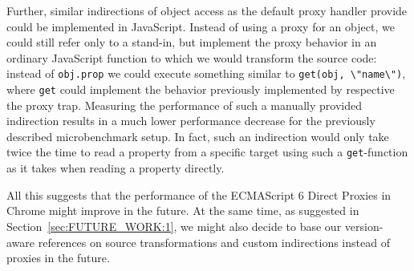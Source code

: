Further, similar indirections of object access as the default proxy handler provide could be implemented in JavaScript.
Instead of using a proxy for an object, we could still refer only to a stand-in, but implement the proxy behavior in an ordinary JavaScript function to which we would transform the source code: instead of \lstinline{obj.prop} we could execute something similar to \lstinline{get(obj, \"name\")}, where \lstinline{get} could implement the behavior previously implemented by respective the proxy trap.
Measuring the performance of such a manually provided indirection results in a much lower performance decrease for the previously described microbenchmark setup.
In fact, such an indirection would only take twice the time to read a property from a specific target using such a \lstinline{get}-function as it takes when reading a property directly. 


All this suggests that the performance of the ECMAScript 6 Direct Proxies in Chrome might improve in the future.
At the same time, as suggested in Section~\ref{sec:FUTURE_WORK:1}, we might also decide to base our version-aware references on source transformations and custom indirections instead of proxies in the future.
